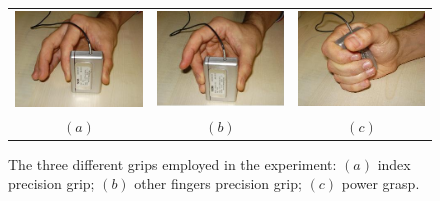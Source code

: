 \begin{figure}[!ht] \centering
  \begin{tabular}{ccc}
   \includegraphics[height=0.16\textheight]{figs/grip1} &
    \includegraphics[height=0.16\textheight]{figs/grip2} &
    \includegraphics[height=0.16\textheight]{figs/grip3} \\
    $(a)$ & $(b)$ & $(c)$ \\
  \end{tabular}
  \caption{The three different grips employed in the experiment: $(a)$
   index precision grip; $(b)$ other fingers precision grip; $(c)$
   power grasp.}
  \label{fig:Grasps}
\end{figure}

